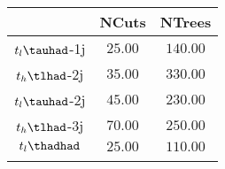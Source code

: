 \centering
\begin{tabular}{ccc} \toprule\toprule
 & NCuts & NTrees\\\midrule
$t_{l}\tauhad$-1j & $25.00$ & $140.00$\\
$t_{h}\tlhad$-2j & $35.00$ & $330.00$\\
$t_{l}\tauhad$-2j & $45.00$ & $230.00$\\
$t_{h}\tlhad$-3j & $70.00$ & $250.00$\\
$t_{l}\thadhad$ & $25.00$ & $110.00$\\
\bottomrule\bottomrule\\
\end{tabular}
